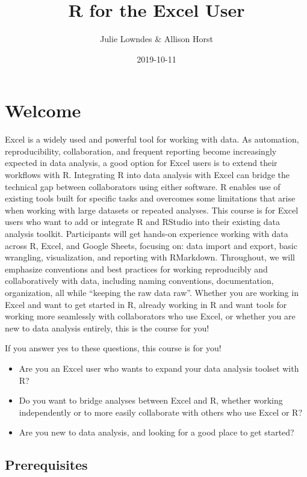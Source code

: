 \documentclass[]{book}
\title{R for the Excel User}
\author{Julie Lowndes \& Allison Horst}
\date{2019-10-11}
\providecommand{\tightlist}{%
  \setlength{\itemsep}{0pt}\setlength{\parskip}{0pt}}
\begin{document}
\maketitle

{
\setcounter{tocdepth}{1}
\tableofcontents
}
\hypertarget{welcome}{%
\chapter{Welcome}\label{welcome}}

Excel is a widely used and powerful tool for working with data. As automation, reproducibility, collaboration, and frequent reporting become increasingly expected in data analysis, a good option for Excel users is to extend their workflows with R. Integrating R into data analysis with Excel can bridge the technical gap between collaborators using either software. R enables use of existing tools built for specific tasks and overcomes some limitations that arise when working with large datasets or repeated analyses. This course is for Excel users who want to add or integrate R and RStudio into their existing data analysis toolkit. Participants will get hands-on experience working with data across R, Excel, and Google Sheets, focusing on: data import and export, basic wrangling, visualization, and reporting with RMarkdown. Throughout, we will emphasize conventions and best practices for working reproducibly and collaboratively with data, including naming conventions, documentation, organization, all while ``keeping the raw data raw''. Whether you are working in Excel and want to get started in R, already working in R and want tools for working more seamlessly with collaborators who use Excel, or whether you are new to data analysis entirely, this is the course for you!

If you answer yes to these questions, this course is for you!

\begin{itemize}
\tightlist
\item
  Are you an Excel user who wants to expand your data analysis toolset with R?
\item
  Do you want to bridge analyses between Excel and R, whether working independently or to more easily collaborate with others who use Excel or R?
\item
  Are you new to data analysis, and looking for a good place to get started?
\end{itemize}

\hypertarget{prerequisites}{%
\section{Prerequisites}\label{prerequisites}}
\end{document}
